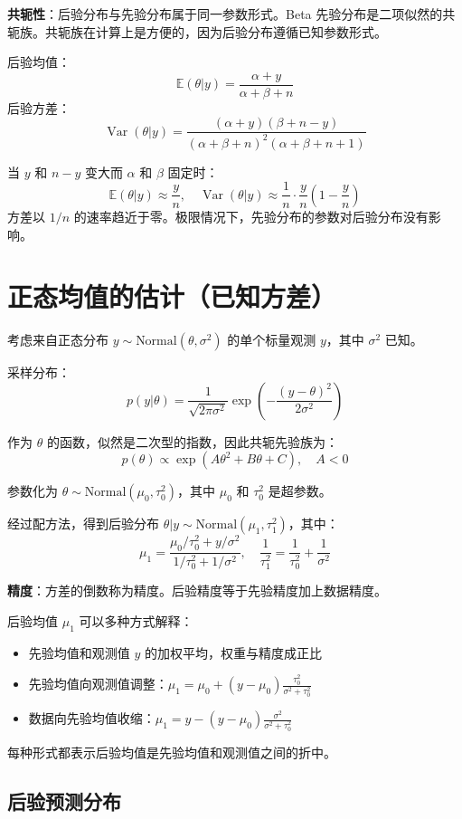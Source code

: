 \textbf{共轭性}：后验分布与先验分布属于同一参数形式。Beta 先验分布是二项似然的共轭族。共轭族在计算上是方便的，因为后验分布遵循已知参数形式。

后验均值：
\[
\mathbb{E}(\theta|y) = \frac{\alpha+y}{\alpha+\beta+n}
\]
后验方差：
\[
\operatorname{Var}(\theta|y) = \frac{(\alpha+y)(\beta+n-y)}{(\alpha+\beta+n)^2(\alpha+\beta+n+1)}
\]

当 $y$ 和 $n-y$ 变大而 $\alpha$ 和 $\beta$ 固定时：
\[
\mathbb{E}(\theta|y) \approx \frac{y}{n}, \quad \operatorname{Var}(\theta|y) \approx \frac{1}{n} \cdot \frac{y}{n}\left(1-\frac{y}{n}\right)
\]
方差以 $1/n$ 的速率趋近于零。极限情况下，先验分布的参数对后验分布没有影响。

\section{正态均值的估计（已知方差）}

考虑来自正态分布 $y \sim \text{Normal}(\theta, \sigma^2)$ 的单个标量观测 $y$，其中 $\sigma^2$ 已知。

采样分布：
\[
p(y|\theta) = \frac{1}{\sqrt{2\pi\sigma^2}} \exp\left(-\frac{(y-\theta)^2}{2\sigma^2}\right)
\]

作为 $\theta$ 的函数，似然是二次型的指数，因此共轭先验族为：
\[
p(\theta) \propto \exp(A\theta^2 + B\theta + C), \quad A < 0
\]

参数化为 $\theta \sim \text{Normal}(\mu_0, \tau_0^2)$，其中 $\mu_0$ 和 $\tau_0^2$ 是超参数。

经过配方法，得到后验分布 $\theta|y \sim \text{Normal}(\mu_1, \tau_1^2)$，其中：
\[
\mu_1 = \frac{\mu_0/\tau_0^2 + y/\sigma^2}{1/\tau_0^2 + 1/\sigma^2}, \quad \frac{1}{\tau_1^2} = \frac{1}{\tau_0^2} + \frac{1}{\sigma^2}
\]

\textbf{精度}：方差的倒数称为精度。后验精度等于先验精度加上数据精度。

后验均值 $\mu_1$ 可以多种方式解释：
\begin{itemize}
  \item 先验均值和观测值 $y$ 的加权平均，权重与精度成正比
  \item 先验均值向观测值调整：$\mu_1 = \mu_0 + (y-\mu_0)\frac{\tau_0^2}{\sigma^2+\tau_0^2}$
  \item 数据向先验均值收缩：$\mu_1 = y - (y-\mu_0)\frac{\sigma^2}{\sigma^2+\tau_0^2}$
\end{itemize}

每种形式都表示后验均值是先验均值和观测值之间的折中。

\subsection{后验预测分布}

